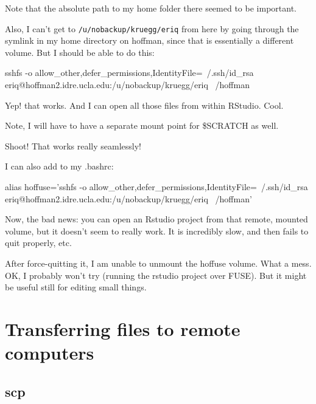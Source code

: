 \documentclass[]{krantz}
\makeatletter
\newenvironment{Shaded}{\begin{snugshade}}{\end{snugshade}}
\newcommand{\BuiltInTok}[1]{#1}
\newcommand{\ExtensionTok}[1]{#1}
\newcommand{\NormalTok}[1]{#1}
\newcommand{\StringTok}[1]{\textcolor[rgb]{0.5,0.5,0.5}{#1}}
\newenvironment{kframe}{%
\medskip{}
\setlength{\fboxsep}{.8em}
 \def\at@end@of@kframe{}%
 \ifinner\ifhmode%
  \def\at@end@of@kframe{\end{minipage}}%
  \begin{minipage}{\columnwidth}%
 \fi\fi%
 \def\FrameCommand##1{\hskip\@totalleftmargin \hskip-\fboxsep
 \colorbox{shadecolor}{##1}\hskip-\fboxsep
     \hskip-\linewidth \hskip-\@totalleftmargin \hskip\columnwidth}%
 \MakeFramed {\advance\hsize-\width
   \@totalleftmargin\z@ \linewidth\hsize
   \@setminipage}}%
 {\par\unskip\endMakeFramed%
 \at@end@of@kframe}
\renewenvironment{Shaded}{\begin{kframe}}{\end{kframe}}
\makeatother
\begin{document}
Note that the absolute path to my home folder there seemed to be important.

Also, I can't get to \texttt{/u/nobackup/kruegg/eriq} from here by going through the symlink in my home directory
on hoffman, since that is essentially a different volume. But I should
be able to do this:

\begin{Shaded}
\begin{Highlighting}[]
\ExtensionTok{sshfs}\NormalTok{ -o allow_other,defer_permissions,IdentityFile=~/.ssh/id_rsa eriq@hoffman2.idre.ucla.edu:/u/nobackup/kruegg/eriq  ~/hoffman}
\end{Highlighting}
\end{Shaded}

Yep! that works. And I can open all those files from within RStudio. Cool.

Note, I will have to have a separate mount point for \$SCRATCH as well.

Shoot! That works really seamlessly!

I can also add to my .bashrc:

\begin{Shaded}
\begin{Highlighting}[]
\BuiltInTok{alias}\NormalTok{ hoffuse=}\StringTok{'sshfs -o allow_other,defer_permissions,IdentityFile=~/.ssh/id_rsa eriq@hoffman2.idre.ucla.edu:/u/nobackup/kruegg/eriq  ~/hoffman'}
\end{Highlighting}
\end{Shaded}

Now, the bad news: you can open an Rstudio project from that remote, mounted volume, but it
doesn't seem to really work. It is incredibly slow, and then fails to quit properly, etc.

After force-quitting it, I am unable to unmount the hoffuse volume. What a mess. OK, I probably
won't try (running the rstudio project over FUSE). But it might be useful still for editing
small things.

\hypertarget{transferring-files-to-remote-computers}{%
\section{Transferring files to remote computers}\label{transferring-files-to-remote-computers}}

\hypertarget{scp}{%
\subsection{scp}\label{scp}}
\end{document}

